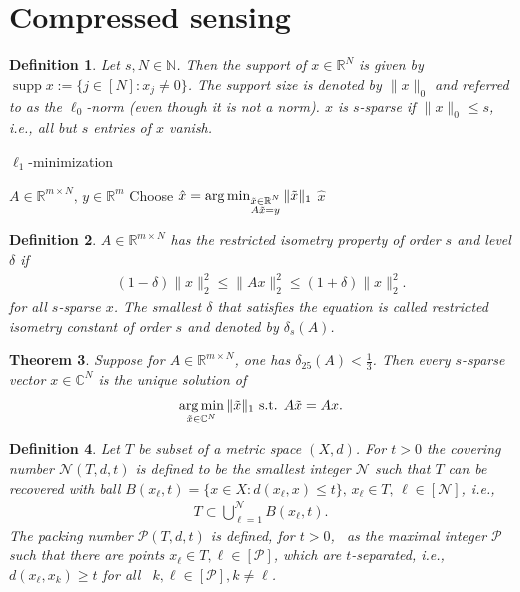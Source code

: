 \documentclass[13pt]{article}
\newtheorem{thm}{Theorem}[section]
\theoremstyle{plain}
\newtheorem{defi}[thm]{Definition}
\newcommand{\R}{\mathbb{R}}
\newcommand{\C}{\mathbb{C}}
\newcommand{\N}{\mathbb{N}}
\newcommand{\NN}{\mathcal{N}}
\newcommand{\PP}{\mathcal{P}}
\newcommand{\set}[1]{{\{#1\}}}
\DeclareMathOperator{\argmin}{\arg\min}
\DeclareMathOperator{\supp}{supp}
\newcommand{\til}{\ensuremath{\tilde}}
\begin{document}
\newpage

\section{Compressed sensing}

\begin{defi}
    Let $s, N \in \N$. Then the \emph{support} of $x \in \R^N$ is given by
    $\supp x := \set{j \in [N] : x_j \ne 0}$. The support size is
    denoted by $\|x\|_0$ and referred to as the \emph{$\ell_0$-norm} (even though it is not a norm).
    $x$ is $s$-sparse if $\|x\|_0 \le s$, i.e., all but $s$ entries of $x$ vanish.
\end{defi}

\begin{algorithm}
\caption{$\ell_1$-minimization}\label{alg:l1_min}
\begin{algorithmic}
    \Require $A \in \R^{m \times N},\, y \in \R^{m}$
    \State Choose $\hat{x} = \argmin_{\substack{\til{x} \in \R^N\\ A\til{x} = y}} \|\til{x}\|_1$  
    \State \Return $\hat{x}$ 
\end{algorithmic}
\end{algorithm}

\begin{defi}
    $A \in \R^{m \times N}$ has the \emph{restricted isometry property} of order $s$
    and level $\delta$ if
    \[
        \begin{aligned}
            (1-\delta)\|x\|_2^2 \le \|Ax\|_2^2 \le (1+\delta)\|x\|_2^2.
        \end{aligned}
    \] for all $s$-sparse $x$. The smallest $\delta$ that satisfies the equation
    is called \emph{restricted isometry constant} of order $s$ and denoted by $\delta_s(A)$.
\end{defi}

\begin{thm}
    Suppose for $A \in \R^{m \times N}$, one has $\delta_{25}(A) < \frac{1}{3}$.
    Then every $s$-sparse vector $x \in \C^N$ is the unique solution of
    \[
        \begin{aligned}
            \argmin\limits_{\til{x} \in \C^N} \|\til{x}\|_1 \text{ s.t. } A\til{x} = Ax.
        \end{aligned}
    \]
\end{thm} 

\begin{defi}
    Let $T$ be subset of a metric space $(X,d)$. For $t > 0$ the \emph{covering number}
    $\NN(T,d,t)$ is defined to be the smallest integer $\NN$ such that
    $T$ can be recovered with ball $B(x_{\ell},t) = \set{x \in X : d(x_\ell,x) \le t},\,\allowbreak x_\ell \in T,\, \ell \in [\NN]$, i.e.,
    \[
        \begin{aligned}
            T \subset \bigcup_{\ell = 1}^\NN B(x_\ell,t).
        \end{aligned}
    \]
    The \emph{packing number} $\PP(T,d,t)$ is defined, for $t > 0$,  as the maximal integer $\PP$
    such that there are points $x_\ell \in T, \ell \in [\PP]$, which are $t$-separated, i.e.,
    $d(x_\ell,x_k) \ge t$ for all  $k,\ell \in [\PP], k \ne \ell$.
\end{defi}
\end{document}
